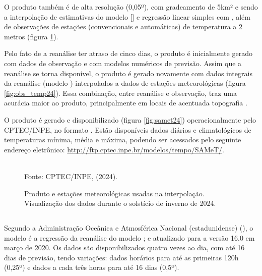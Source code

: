 \indent O produto  também é de alta resolução (0,05º), com gradeamento de 5km² e sendo a interpolação de estimativas do modelo  [] e regressão linear simples com , além de observações de estações (convencionais e automáticas) de temperatura a 2 metros (figura \ref{fig:samet_obs24}).
 
\indent Pelo fato de a reanálise ter atraso de cinco dias, o produto é inicialmente gerado com dados de observação e com modelos numéricos de previsão. Assim que a reanálise se torna disponível, o produto é gerado novamente com dados integrais da reanálise (modelo ) interpolados a dados de estações meteorológicas (figura \ref{fig:obs_temp24}). Essa combinação, entre reanálise e observação, traz uma acurácia maior ao produto, principalmente em locais de acentuada topografia \cite{Rozante2021SAMeT}.

\indent O produto é gerado e disponibilizado (figura \ref{fig:samet24}) operacionalmente pelo \acrshort{CPTEC}/\acrshort{INPE}, no formato . Estão disponíveis dados diários e climatológicos de temperaturas mínima, média e máxima, podendo ser acessados pelo seguinte endereço eletrônico: \url{http://ftp.cptec.inpe.br/modelos/tempo/SAMeT/}.

\begin{figure}[htbp]
    \centering
    \caption{Produto  e estações meteorológicas usadas na interpolação. Visualização dos dados durante o solstício de inverno de 2024.} %
    \label{fig:samet_obs24}
    \hfill
    \\
    \small{Fonte: \acrshort{CPTEC}/\acrshort{INPE}, \citeauthor{Rozante2021SAMeT} (2024).}
\end{figure}

\subsection{}

\indent Segundo a Administração Oceânica e Atmosférica Nacional (estadunidense) \citeyear{GFS} (), o modelo  é a regressão da reanálise do modelo ; e atualizado para a versão 16.0 em março de 2020. Os dados são disponibilizados quatro vezes ao dia, com até 16 dias de previsão, tendo variações: dados horários para até as primeiras 120h (0,25º) e dados a cada três horas para até 16 dias (0,5º).

